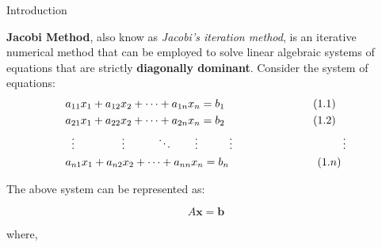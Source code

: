 \documentclass[main]{subfiles}
\begin{document}
    {\Huge Introduction\\}

    \textbf{Jacobi Method}, also know as \textit{Jacobi's iteration method}, is an iterative numerical 
    method that can be employed to solve linear algebraic systems of equations that are strictly \textbf{diagonally dominant}.
    Consider the system of equations:
    \\        


    \begin{align*}\label{eq1}
        &a_{11}x_1 + a_{12}x_2 + \cdots + a_{1n}x_n = b_1 \quad\quad\quad\quad\quad\quad\quad\quad(1.1)\\
        &a_{21}x_1 + a_{22}x_2 + \cdots + a_{2n}x_n = b_2  \quad\quad\quad\quad\quad\quad\quad\quad(1.2)\\
        &\;\;\vdots \hspace{15mm} \vdots \hspace{10mm} \ddots \hspace{7mm} \vdots \hspace{10mm} \vdots\quad\quad\quad\quad\quad\quad\quad\quad\quad\quad\vdots \\
        &a_{n1}x_1 + a_{n2}x_2 + \cdots + a_{nn}x_n = b_n \quad\quad\quad\quad\quad\quad\quad\quad(1.n)
    \end{align*}


    \vspace{19mm}  

    The above system can be represented as:

    \begin{equation}
        A\textbf{x} = \textbf{b}
    \end{equation}
    \vspace{10mm}
    
    where, 
\end{document}
